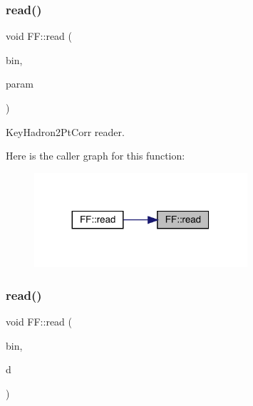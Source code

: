 \subsubsection{\texorpdfstring{read()}{read()}\hspace{0.1cm}{\footnotesize\ttfamily [13/15]}}
{\footnotesize\ttfamily void F\+F\+::read (\begin{DoxyParamCaption}\item[{\mbox{\hyperlink{classADATIO_1_1BinaryReader}{Binary\+Reader}} \&}]{bin,  }\item[{\mbox{\hyperlink{structFF_1_1KeyHadron2PtCorr__t}{Key\+Hadron2\+Pt\+Corr\+\_\+t}} \&}]{param }\end{DoxyParamCaption})}



Key\+Hadron2\+Pt\+Corr reader. 

Here is the caller graph for this function\+:
\nopagebreak
\begin{figure}[H]
\begin{center}
\leavevmode
\includegraphics[width=224pt]{d5/da6/namespaceFF_a7b6f77b4f2cff40fc56befd4b4c64b7d_icgraph}
\end{center}
\end{figure}
\mbox{\label{namespaceFF_adbbf0211a7578841555412497b4f18c4}} 
\subsubsection{\texorpdfstring{read()}{read()}\hspace{0.1cm}{\footnotesize\ttfamily [14/15]}}
{\footnotesize\ttfamily void F\+F\+::read (\begin{DoxyParamCaption}\item[{\mbox{\hyperlink{classADATIO_1_1BinaryReader}{Binary\+Reader}} \&}]{bin,  }\item[{\mbox{\hyperlink{classFF_1_1DiscoValOperator__t}{Disco\+Val\+Operator\+\_\+t}} \&}]{d }\end{DoxyParamCaption})}



